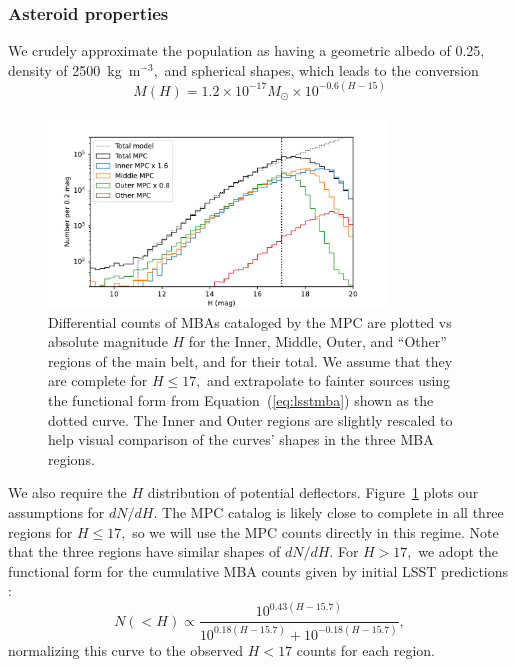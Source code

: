 \documentclass[linenumbers, onecolumn]{aastex631}
\newcommand{\eqq}[1]{Equation~(\ref{#1})}
\begin{document}
\subsubsection{Asteroid properties}
\label{sec:mbaprops}
We crudely approximate the population as having a geometric albedo of 0.25,
density of 2500~kg~m$^{-3},$ and spherical shapes, which leads to the
conversion
\begin{equation}
  M(H) = 1.2\times10^{-17} M_\odot \times 10^{-0.6(H-15)}
\end{equation}

\begin{figure}
  \centering
  \includegraphics[width=0.8\textwidth]{mbacounts.pdf}
  \caption{Differential counts of MBAs cataloged by the MPC are
    plotted vs absolute magnitude $H$  
    for the Inner, Middle, Outer, and ``Other'' regions of
    the main belt, and for their total.  We assume that they are
    complete for $H\le17,$ and extrapolate to fainter sources using
    the functional form from \eqq{eq:lsstmba} shown as the dotted
    curve. The Inner and Outer regions are slightly rescaled to help
    visual comparison of the curves' shapes in the three MBA regions.}
  \label{fig:counts}
\end{figure}
We also require the $H$ distribution of potential deflectors.
Figure~\ref{fig:counts} plots our assumptions for $dN/dH.$  The MPC
catalog is likely close to complete in all three regions for $H\le17,$
so we will use the MPC counts directly in this regime.  Note that the
three regions have similar shapes of $dN/dH.$  For $H>17,$ we adopt
the functional form for the cumulative MBA counts given by
initial LSST predictions \citep{lsstbook}:
\begin{equation}
  N(<H) \propto \frac{10^{0.43(H-15.7)}}{10^{0.18(H-15.7)} +
    10^{-0.18(H-15.7)}},
\label{eq:lsstmba}
\end{equation}
normalizing this curve to the observed $H<17$ counts for each region.
\end{document}
